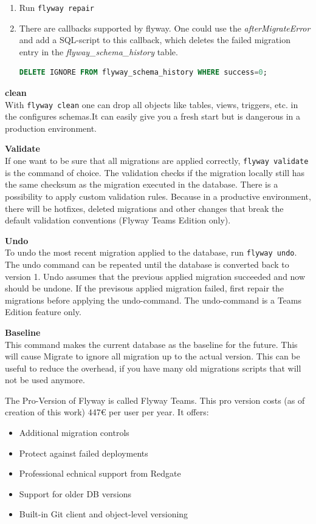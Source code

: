 \begin{enumerate}
	\item Run \texttt{flyway repair}\\
	\item There are callbacks supported by flyway. One could use the \textit{afterMigrateError} and add a SQL-script to this callback, which deletes the failed migration entry in the \textit{flyway\_schema\_history} table.
	
	\begin{lstlisting}[language=SQL]
		DELETE IGNORE FROM flyway_schema_history WHERE success=0;
	\end{lstlisting}
\end{enumerate}

\textbf{clean}\\
With \texttt{flyway clean} one can drop all objects like tables, views, triggers, etc. in the configures schemas.It can easily give you a fresh start but is dangerous in a production environment.

\textbf{Validate}\\
If one want to be sure that all migrations are applied correctly,  \texttt{flyway validate} is the command of choice. The validation checks if the migration locally still has the same checksum as the migration executed in the database.
There is a possibility to apply custom validation rules. Because in a productive environment, there will be hotfixes, deleted migrations and other changes that break the default validation conventions (Flyway Teams Edition only).

\textbf{Undo}\\
To undo the most recent migration applied to the database, run \texttt{flyway undo}. The undo command can be repeated until the database is converted back to version 1.
Undo assumes that the previous applied migration succeeded and now should be undone. If the previsous applied migration failed, first repair the migrations before applying the undo-command. 
The undo-command is a Teams Edition feature only.

\textbf{Baseline}\\
This command makes the current database as the baseline for the future. This will cause Migrate to ignore all migration up to the actual version.
This can be useful to reduce the overhead, if you have many old migrations scripts that will not be used anymore.

%
The Pro-Version of Flyway is called Flyway Teams. This pro version costs (as of creation of this work) 447€ per user per year. It offers:
\begin{itemize}
	\item Additional migration controls
	\item Protect against failed deployments
	\item Professional echnical support from Redgate
	\item Support for older DB versions
	\item Built-in Git client and object-level versioning
\end{itemize}

